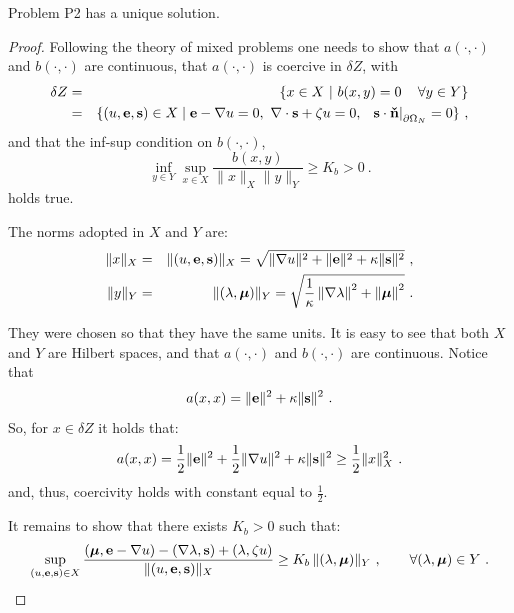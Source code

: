 \begin{theorem}[Uniqueness]
	Problem P2 has a unique solution.
	
	\begin{proof}
		Following the theory of mixed problems \cite{brezzi-fortin,ern-guermond} one needs to show that $a(\cdot,\cdot)$ and $b(\cdot,\cdot)$ are continuous, that $a(\cdot,\cdot)$ is coercive in $\delta Z$, with
		\begin{eqnarray}
			\delta Z&=&\{x\in X~|~b(x,y)=0\, \quad \forall y\in Y\}\nonumber \\
			&=&\{(u,\mathbf{e},\mathbf{s})\in X \mid \mathbf{e}-\nabla u=0, ~\nabla \cdot \mathbf{s} + \zeta u =0,~\left. ~\mathbf{s} \cdot \mathbf{\check{n}}\right |_{\partial\Omega_N} = 0  \}~,
		\end{eqnarray}
		and that the inf-sup condition on $b(\cdot,\cdot)$,
		\begin{equation}
			\inf_{y\in Y}\sup_{x\in X} \frac{b(x,y)}{\|x\|_X\|y\|_Y} \geq K_b > 0~.
		\end{equation}
		holds true.
		
		The norms adopted in $X$ and $Y$ are: 
		\begin{eqnarray}
			\|x\|_X &=& \|(u,\mathbf{e},\mathbf{s})\|_X = \sqrt{\|\nabla u\|^2+\|\mathbf{e}\|^2+\kappa \|\mathbf{s}\|^2}~,\\
			\|y\|_Y &=& \|(\lambda,\boldsymbol{\mu})\|_Y=\sqrt{\frac{1}{\kappa}\left \| \nabla \lambda \right \|^2+\left\|\boldsymbol{\mu} \right \|^2}~.
		\end{eqnarray}
		
		They were chosen so that they have the same units. It is easy to see that both $X$ and $Y$ are Hilbert spaces, and that $a(\cdot,\cdot)$ and $b(\cdot,\cdot)$ are continuous. Notice that
		\begin{equation*}
				a(x,x)=\|\mathbf{e}\|^2 + \kappa \|\mathbf{s}\|^2 ~.
		\end{equation*}
		So, for $x \in \delta Z$ it holds that:
		\begin{equation*}
			a(x,x)= \frac12 \|\mathbf{e}\|^2 +\frac12 \|\nabla u\|^2+ \kappa \|\mathbf{s}\|^2 \geq \frac12 \|x\|_X^2~.
		\end{equation*}
		and, thus, coercivity holds with constant equal to $\frac12$.
		
		It remains to show that there exists $K_b>0$ such that:
		\begin{equation*}
			\sup_{(u,\mathbf{e},\mathbf{s})\in X} \frac{\left (\boldsymbol{\mu},\mathbf{e}-\nabla u \right ) - \left (\nabla \lambda, \mathbf{s} \right ) + \left ( \lambda, \zeta u \right )}{\|(u,\mathbf{e},\mathbf{s})\|_X} \geq K_b \, \|(\lambda,\boldsymbol{\mu})\|_{Y}~, \qquad \forall (\lambda,\boldsymbol{\mu})\in Y~.
		\end{equation*}
	

\end{proof}
\end{theorem}
